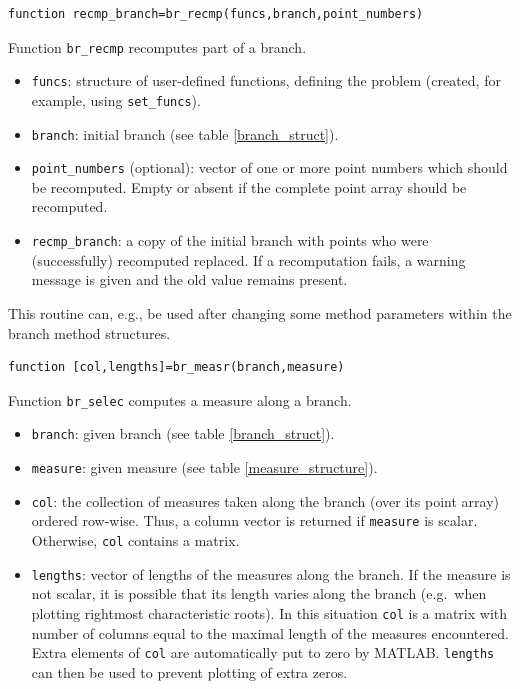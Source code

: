 \documentclass[10pt]{scrartcl}
\newcommand{\blist}[1]{\mbox{\lstinline!#1!}}
\begin{document}
{\begin{lstlisting} 
function recmp_branch=br_recmp(funcs,branch,point_numbers) 
\end{lstlisting}
\noindent Function \blist{br_recmp} recomputes part of a branch.
\begin{itemize}
\item \blist{funcs}: structure of user-defined functions, defining the
  problem (created, for example, using \blist{set_funcs}).
\item \blist{branch}: initial branch (see table \ref{branch_struct}).
\item \blist{point_numbers} (optional): vector of one or more point
  numbers which should be recomputed. Empty or absent if the complete
  point array should be recomputed.
\item \blist{recmp_branch}: a copy of the initial branch with points
  who were (successfully) recomputed replaced. If a recomputation
  fails, a warning message is given and the old value remains present.
\end{itemize}
This routine can, e.g., be used after changing some method parameters
within the branch method structures.

\begin{lstlisting}
function [col,lengths]=br_measr(branch,measure)  
\end{lstlisting}
\noindent Function \blist{br_selec} computes a measure along a branch.
\begin{itemize}
\item \blist{branch}: given branch (see table \ref{branch_struct}).
\item \blist{measure}: given measure (see table \ref{measure_structure}).
\item \blist{col}: the collection of measures taken along the
branch (over its point array) ordered row-wise. Thus, a column vector
is returned if \blist{measure} is scalar. Otherwise,
\blist{col} contains a matrix.
\item \blist{lengths}: vector of lengths of the measures along the
  branch.  If the measure is not scalar, it is possible that its
  length varies along the branch (e.g.~when plotting rightmost
  characteristic roots). In this situation \blist{col} is a matrix
  with number of columns equal to the maximal length of the measures
  encountered.  Extra elements of \blist{col} are automatically put to
  zero by MATLAB.  \blist{lengths} can then be used to prevent
  plotting of extra zeros.
\end{itemize}

}
\end{document}
